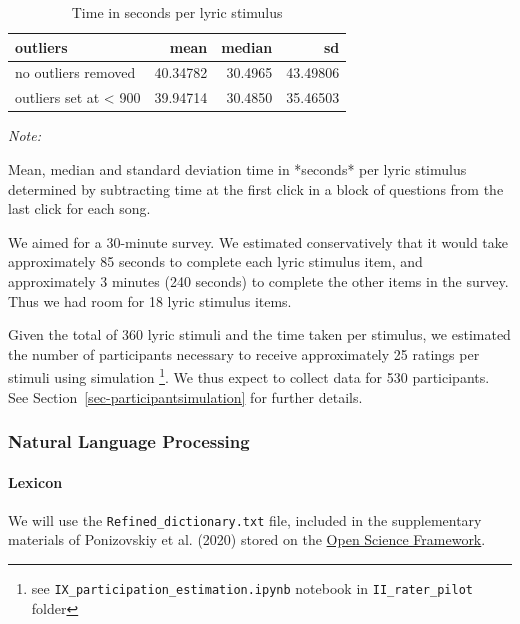 \documentclass[
  letterpaper,
  DIV=11,
  numbers=noendperiod]{scrartcl}
\let\oldparagraph\paragraph
\renewcommand{\paragraph}[1]{\oldparagraph{#1}\mbox{}}
\begin{document}
\hypertarget{tbl-2}{}
\begin{table}
\caption{\label{tbl-2}Time in seconds per lyric stimulus }\tabularnewline

\centering
\begin{threeparttable}
\begin{tabular}{l|r|r|r}
\hline
outliers & mean & median & sd\\
\hline
no outliers removed & 40.34782 & 30.4965 & 43.49806\\
\hline
outliers set at < 900 & 39.94714 & 30.4850 & 35.46503\\
\hline
\end{tabular}
\begin{tablenotes}[para]
\item \textit{Note: } 
\item Mean, median and standard deviation time in *seconds* per lyric stimulus determined by subtracting time at the first click in a block of questions from the last click for each song.
\end{tablenotes}
\end{threeparttable}
\end{table}

We aimed for a 30-minute survey. We estimated conservatively that it
would take approximately 85 seconds to complete each lyric stimulus
item, and approximately 3 minutes (240 seconds) to complete the other
items in the survey. Thus we had room for 18 lyric stimulus items.

Given the total of 360 lyric stimuli and the time taken per stimulus, we
estimated the number of participants necessary to receive approximately
25 ratings per stimuli using simulation \footnote{see
  \texttt{IX\_participation\_estimation.ipynb} notebook in
  \texttt{II\_rater\_pilot} folder}. We thus expect to collect data for
530 participants. See Section~\ref{sec-participantsimulation} for
further details.

\hypertarget{natural-language-processing}{%
\subsubsection{Natural Language
Processing}\label{natural-language-processing}}

\hypertarget{lexicon}{%
\paragraph{Lexicon}\label{lexicon}}

We will use the \texttt{Refined\_dictionary.txt} file, included in the
supplementary materials of Ponizovskiy et al. (2020) stored on the
\href{https://osf.io/vy475/}{Open Science Framework}.
\end{document}
